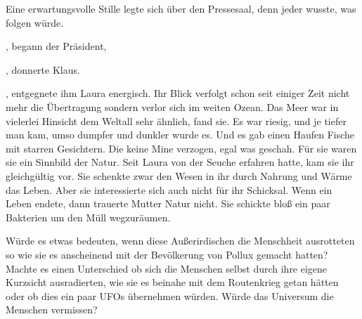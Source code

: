 \par

Eine erwartungsvolle Stille legte sich über den Pressesaal, denn jeder wusste, was folgen würde.

\par

, begann der Präsident, 

\par

, donnerte Klaus. 

\par

, entgegnete ihm Laura energisch. Ihr Blick verfolgt schon seit einiger Zeit nicht mehr die Übertragung sondern verlor sich im weiten Ozean. Das Meer war in vielerlei Hinsicht dem Weltall sehr ähnlich, fand sie. Es war riesig, und je tiefer man kam, umso dumpfer und dunkler wurde es. Und es gab einen Haufen Fische mit starren Gesichtern. Die keine Mine verzogen, egal was geschah. Für sie waren sie ein Sinnbild der Natur. Seit Laura von der Seuche erfahren hatte, kam sie ihr gleichgültig vor. Sie schenkte zwar den Wesen in ihr durch Nahrung und Wärme das Leben. Aber sie interessierte sich auch nicht für ihr Schicksal. Wenn ein Leben endete, dann trauerte Mutter Natur nicht. Sie schickte bloß ein paar Bakterien um den Müll wegzuräumen.

\par

Würde es etwas bedeuten, wenn diese Außerirdischen die Menschheit ausrotteten so wie sie es anscheinend mit der Bevölkerung von Pollux gemacht hatten? Machte es einen Unterschied ob sich die Menschen selbst durch ihre eigene Kurzsicht ausradierten, wie sie es beinahe mit dem Routenkrieg getan hätten oder ob dies ein paar UFOs übernehmen würden. Würde das Universum die Menschen vermissen?

